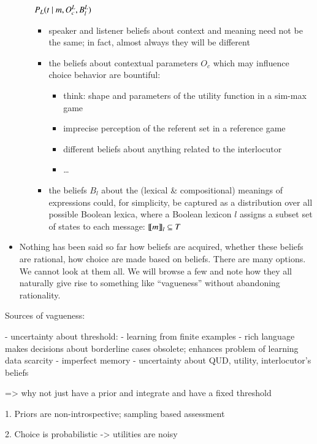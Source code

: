 \documentclass[fleqn,reqno,10pt]{article}
\begin{document}
\begin{itemize}
\begin{itemize}
    $P_L(t \mid m, O^L_c, B^L_l)$
    \begin{itemize}
    \item speaker and listener beliefs about context and meaning need not be the same; in fact,
      almost always they will be different
    \item the beliefs about contextual parameters $O_c$ which may influence choice behavior are
      bountiful:
      \begin{itemize}
      \item think: shape and parameters of the utility function in a sim-max game
      \item imprecise perception of the referent set in a reference game
      \item different beliefs about anything related to the interlocutor
      \item \dots
      \end{itemize}
    \item the beliefs $B_l$ about the (lexical \& compositional) meanings of expressions could,
      for simplicity, be captured as a distribution over all possible Boolean lexica, where a
      Boolean lexicon $l$ assigns a subset set of states to each message: $\left [\! \left [ m \right ]\! \right]_l
      \subseteq T$
    \end{itemize}
  \end{itemize}
\item Nothing has been said so far how beliefs are acquired, whether these beliefs are
  rational, how choice are made based on beliefs. There are many options. We cannot look at
  them all. We will browse a few and note how they all naturally give rise to something like
  ``vagueness'' without abandoning rationality.

\end{itemize}


\newpage


Sources of vagueness:

- uncertainty about threshold:
   - learning from finite examples
   - rich language makes decisions about borderline cases obsolete; enhances problem of learning data scarcity
   - imperfect memory
- uncertainty about QUD, utility, interlocutor's beliefs

=> why not just have a prior and integrate and have a fixed threshold

1. Priors are non-introspective; sampling based assessment 

2. Choice is probabilistic -> utilities are noisy
\end{document}
